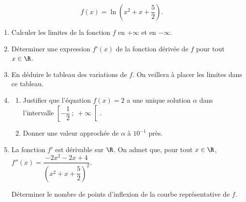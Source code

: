 \[f(x) = \ln \left(x^2 + x + \dfrac{5}{2}\right).\]

\medskip

\begin{enumerate}
\item Calculer les limites de la fonction $f$ en $+\infty$ et en $-\infty$.
\item Déterminer une expression $f'(x)$ de la fonction dérivée de $f$ pour tout $x \in \R$.
\item En déduire le tableau des variations de $f$. On veillera à placer les limites dans ce tableau.
\item 
	\begin{enumerate}
		\item Justifier que l'équation $f(x) = 2$ a une unique solution $\alpha$ dans l'intervalle $\left[-\dfrac{1}{2}~;~+ \infty\right[$. 
		\item Donner une valeur approchée de $\alpha$ à $10^{-1}$ près.
 	\end{enumerate}
\item La fonction $f'$ est dérivable sur $\R$. On admet que, pour tout $x \in  \R$,\,  $f''(x) = \dfrac{-2x^2 - 2x + 4}{\left(x^2 + x + \dfrac{5}{2}\right)^2}$.

Déterminer le nombre de points d'inflexion de la courbe représentative de $f$.
\end{enumerate}

\bigskip

